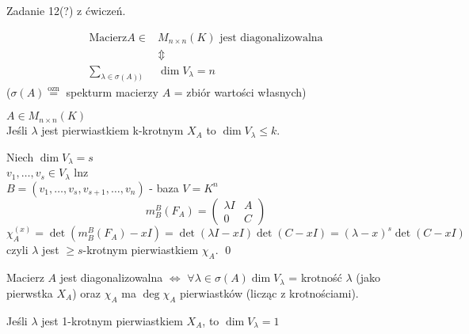 \begin{ft} 
    Zadanie 12(?) z ćwiczeń.
\end{ft} 
\begin{ft} 
    \begin{align*}
        \text{Macierz} A \in &M_{n \times n}(K) \text{ jest diagonalizowalna} \\
         &\Updownarrow \\ 
        \sum _{\lambda \in \sigma (A))}& \dim V_\lambda = n 
    \end{align*}
    ($\sigma (A) \overset{\text{ozn}}{=}$ spekturm macierzy $A$ = zbiór wartości własnych)
\end{ft} 
\begin{ft} 
    $A \in M_{n \times n} (K)$ \\ 
    Jeśli $\lambda$ jest pierwiastkiem k-krotnym $X_A$ to $\dim V_\lambda \le k$.
\end{ft} 
\begin{dd} 
    Niech $\dim V_\lambda = s$ \\ 
    $v_1,\ldots,v_s \in V_\lambda$ lnz \\ 
    $B = (v_1,\ldots,v_s,v_{s+1},\ldots,v_n)$ - baza $V = K^n$
    $$ m_B^B (F_A) = \begin{pmatrix} \lambda I & A \\ 0 & C \end{pmatrix} $$ 
    $ \chi _A ^{(x)} = \det(m_B^B (F_A) - xI) = \det(\lambda I - xI) \det(C - xI) =(\lambda -x)^s \det(C-xI)$ \\
    czyli $\lambda$ jest $\ge s$-krotnym pierwiastkiem $\chi_A$. \hfill \qed 
\end{dd} 
\begin{wn} 
    Macierz $A$ jest diagonalizowalna $\Leftrightarrow$ $\forall \lambda \in \sigma (A) \dim V_\lambda$ = 
    krotność $\lambda$ (jako pierwstka $X_A$) oraz $\chi_A$ ma
    $\deg \chi _A$ pierwiastków (licząc z krotnościami).
\end{wn}
\begin{wn} 
    Jeśli $\lambda$ jest 1-krotnym pierwiastkiem $X_A$, to $\dim V_\lambda = 1$
\end{wn} 
